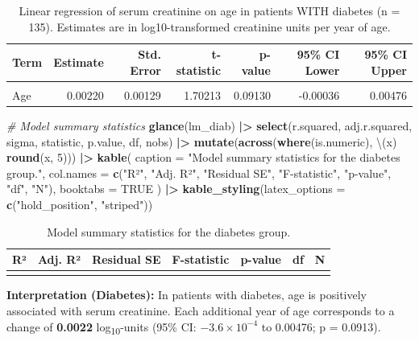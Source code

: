 \documentclass[
  12pt,
]{article}
\newenvironment{Shaded}{\begin{snugshade}}{\end{snugshade}}
\newcommand{\AttributeTok}[1]{\textcolor[rgb]{0.13,0.29,0.53}{#1}}
\newcommand{\CommentTok}[1]{\textcolor[rgb]{0.56,0.35,0.01}{\textit{#1}}}
\newcommand{\ConstantTok}[1]{\textcolor[rgb]{0.56,0.35,0.01}{#1}}
\newcommand{\DecValTok}[1]{\textcolor[rgb]{0.00,0.00,0.81}{#1}}
\newcommand{\FunctionTok}[1]{\textcolor[rgb]{0.13,0.29,0.53}{\textbf{#1}}}
\newcommand{\NormalTok}[1]{#1}
\newcommand{\SpecialCharTok}[1]{\textcolor[rgb]{0.81,0.36,0.00}{\textbf{#1}}}
\newcommand{\StringTok}[1]{\textcolor[rgb]{0.31,0.60,0.02}{#1}}
\begin{document}
\begin{longtable}[t]{lrrrrrr}
\caption{\label{tab:task-g-lm-diabetes}Linear regression of serum creatinine on age in patients WITH diabetes (n = 135). Estimates are in log10-transformed creatinine units per year of age.}\\
\toprule
Term & Estimate & Std. Error & t-statistic & p-value & 95\% CI Lower & 95\% CI Upper\\
\midrule
\cellcolor{gray!10}{(Intercept)} & \cellcolor{gray!10}{-0.06302} & \cellcolor{gray!10}{0.07806} & \cellcolor{gray!10}{-0.80724} & \cellcolor{gray!10}{0.42111} & \cellcolor{gray!10}{-0.21757} & \cellcolor{gray!10}{0.09153}\\
Age & 0.00220 & 0.00129 & 1.70213 & 0.09130 & -0.00036 & 0.00476\\
\bottomrule
\end{longtable}

\begin{Shaded}
\begin{Highlighting}[]
\CommentTok{\# Model summary statistics}
\FunctionTok{glance}\NormalTok{(lm\_diab) }\SpecialCharTok{|\textgreater{}}
  \FunctionTok{select}\NormalTok{(r.squared, adj.r.squared, sigma, statistic, p.value, df, nobs) }\SpecialCharTok{|\textgreater{}}
  \FunctionTok{mutate}\NormalTok{(}\FunctionTok{across}\NormalTok{(}\FunctionTok{where}\NormalTok{(is.numeric), \textbackslash{}(x) }\FunctionTok{round}\NormalTok{(x, }\DecValTok{5}\NormalTok{))) }\SpecialCharTok{|\textgreater{}}
  \FunctionTok{kable}\NormalTok{(}
    \AttributeTok{caption   =} \StringTok{"Model summary statistics for the diabetes group."}\NormalTok{,}
    \AttributeTok{col.names =} \FunctionTok{c}\NormalTok{(}\StringTok{"R²"}\NormalTok{, }\StringTok{"Adj. R²"}\NormalTok{, }\StringTok{"Residual SE"}\NormalTok{, }\StringTok{"F{-}statistic"}\NormalTok{, }\StringTok{"p{-}value"}\NormalTok{, }\StringTok{"df"}\NormalTok{, }\StringTok{"N"}\NormalTok{),}
    \AttributeTok{booktabs  =} \ConstantTok{TRUE}
\NormalTok{  ) }\SpecialCharTok{|\textgreater{}}
  \FunctionTok{kable\_styling}\NormalTok{(}\AttributeTok{latex\_options =} \FunctionTok{c}\NormalTok{(}\StringTok{"hold\_position"}\NormalTok{, }\StringTok{"striped"}\NormalTok{))}
\end{Highlighting}
\end{Shaded}

\begin{longtable}[t]{rrrrrrr}
\caption{\label{tab:task-g-lm-diabetes}Model summary statistics for the diabetes group.}\\
\toprule
R² & Adj. R² & Residual SE & F-statistic & p-value & df & N\\
\midrule
\cellcolor{gray!10}{0.02338} & \cellcolor{gray!10}{0.01531} & \cellcolor{gray!10}{0.15162} & \cellcolor{gray!10}{2.89725} & \cellcolor{gray!10}{0.0913} & \cellcolor{gray!10}{1} & \cellcolor{gray!10}{123}\\
\bottomrule
\end{longtable}

\textbf{Interpretation (Diabetes):} In patients with diabetes, age is
positively associated with serum creatinine. Each additional year of age
corresponds to a change of \textbf{0.0022} log\textsubscript{10}-units
(95\% CI: \ensuremath{-3.6\times 10^{-4}} to 0.00476; p = 0.0913).
\end{document}
